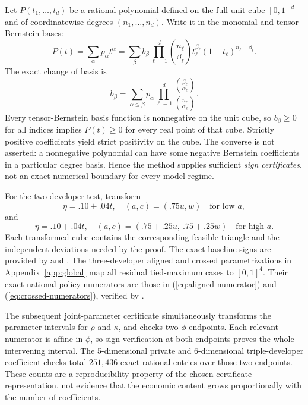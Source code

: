 Let \(P(t_1,\ldots,t_d)\) be a rational polynomial defined on the full unit cube \([0,1]^d\) and of coordinatewise degrees \((n_1,\ldots,n_d)\). Write it in the monomial and tensor-Bernstein bases:
\[
 P(t)=\sum_{\alpha}p_{\alpha}t^{\alpha}
     =\sum_{\beta}b_{\beta}
       \prod_{\ell=1}^d
        \binom{n_\ell}{\beta_\ell}
        t_\ell^{\beta_\ell}(1-t_\ell)^{n_\ell-\beta_\ell}.
\]
The exact change of basis is
\begin{equation}
 b_{\beta}
 =\sum_{\alpha\le\beta}
 p_{\alpha}\prod_{\ell=1}^d
 \frac{\binom{\beta_\ell}{\alpha_\ell}}
      {\binom{n_\ell}{\alpha_\ell}}.
 \label{eq:bernstein-transform}
\end{equation}
Every tensor-Bernstein basis function is nonnegative on the unit cube, so \(b_\beta\ge0\) for all indices implies \(P(t)\ge0\) for every real point of that cube. Strictly positive coefficients yield strict positivity on the cube. The converse is not asserted: a nonnegative polynomial can have some negative Bernstein coefficients in a particular degree basis. Hence the method supplies sufficient \emph{sign certificates}, not an exact numerical boundary for every model regime.

For the two-developer test, transform
\[
 \eta=.10+.04t,\quad
 (a,c)=(.75u,w)\quad\text{for low }a,
\]
and
\[
 \eta=.10+.04t,\quad
 (a,c)=(.75+.25u,\ .75+.25w)
 \quad\text{for high }a.
\]
Each transformed cube contains the corresponding feasible triangle and the independent deviations needed by the proof. The exact baseline signs are provided by
and
.
The three-developer aligned and crossed parametrizations in Appendix~\ref{app:global} map all residual tied-maximum cases to \([0,1]^4\).
Their exact national policy numerators are those in
(\ref{eq:aligned-numerator}) and (\ref{eq:crossed-numerators}),
verified by .

The subsequent joint-parameter certificate simultaneously transforms the parameter intervals for \(\rho\) and \(\kappa\), and checks two \(\phi\) endpoints. Each relevant numerator is affine in \(\phi\), so sign verification at both endpoints proves the whole intervening interval. The 5-dimensional private and 6-dimensional triple-developer coefficient checks total \(251{,}436\) exact rational entries over those two endpoints. These counts are a reproducibility property of the chosen certificate representation, not evidence that the economic content grows proportionally with the number of coefficients.


